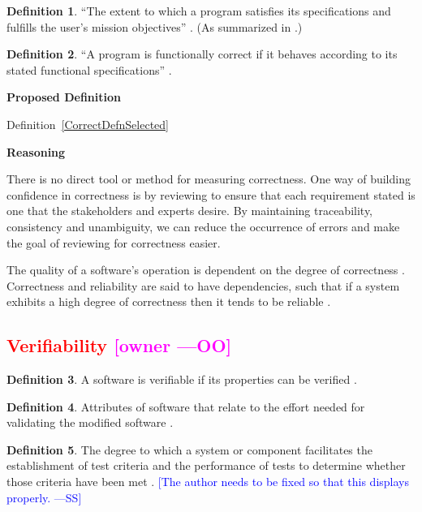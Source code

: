 \documentclass[letterpaper,cleveref]{lipics-v2019}
\newcommand{\authornote}[3]{\textcolor{#1}{[#3 ---#2]}}
\newcommand{\authornote}[3]{}
\newcommand{\wss}[1]{\authornote{blue}{SS}{#1}} %
\newcommand{\oo}[1]{\authornote{magenta}{OO}{#1}} %
\newcommand{\notdone}[1]{\textcolor{red}{#1}}
\theoremstyle{definition}
\newtheorem{defn}{Definition}
\begin{document}
\begin{defn}
  ``The extent to which a program satisfies its specifications and fulfills the
  user's mission objectives'' \citep{McCallEtAl1977}. (As summarized in
  \citet{VanVliet2000}.)
\end{defn}

\begin{defn}
``A program is functionally correct if it behaves according to its stated
functional specifications'' \citep{ghezzi1991fundamentals}.
\end{defn}

\noindent \textbf{Proposed Definition}

Definition~\ref{CorrectDefnSelected}
	
\noindent \textbf{Reasoning}

There is no direct tool or method for measuring correctness. One way of building
confidence in correctness is by reviewing to ensure that each requirement stated
is one that the stakeholders and experts desire.  By maintaining traceability,
consistency and unambiguity, we can reduce the occurrence of errors and make the
goal of reviewing for correctness easier.

The quality of a software's operation is dependent on the degree of correctness
\citep{berander2005software}. Correctness and reliability are said to have
dependencies, such that if a system exhibits a high degree of correctness then
it tends to be reliable \citep{GhezziEtAl2003}.

\subsection{\notdone{Verifiability} \oo{owner}}

\begin{defn}
  A software is verifiable if its properties can be verified
  \citep{GhezziEtAl2003}.
\end{defn}

\begin{defn}
  Attributes of software that relate to the effort needed for validating the
  modified software \citep{berander2005software}.
\end{defn}

\begin{defn}
  The degree to which a system or component facilitates the establishment of
  test criteria and the performance of tests to determine whether those criteria
  have been met \citep{IEEEStdGlossarySET1990}. \wss{The author needs to be
    fixed so that this displays properly.}
\end{defn}
\end{document}
